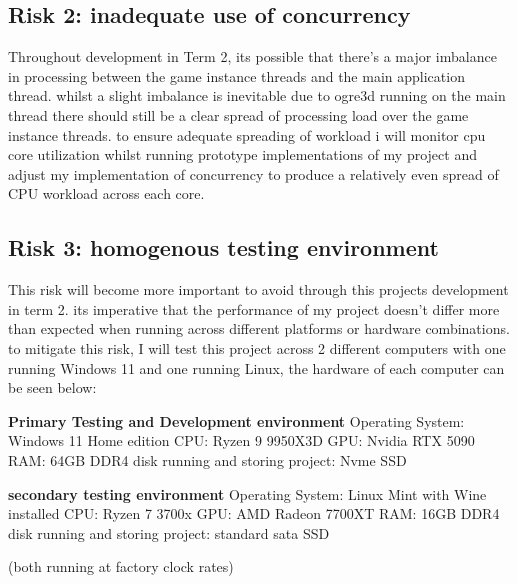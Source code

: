 \documentclass{article}
\begin{document}
\subsection{Risk 2: inadequate use of concurrency}
Throughout development in Term 2, its possible that there's a major imbalance in processing between the game instance threads and the main application thread. whilst a slight imbalance is inevitable due to ogre3d running on the main thread there should still be a clear spread of processing load over the game instance threads. to ensure adequate spreading of workload i will monitor cpu core utilization whilst running prototype implementations of my project and adjust my implementation of concurrency to produce a relatively even spread of CPU workload across each core.

\subsection{Risk 3: homogenous testing environment}
This risk will become more important to avoid through this projects development in term 2. its imperative that the performance of my project doesn't differ more than expected when running across different platforms or hardware combinations. to mitigate this risk, I will test this project across 2 different computers with one running Windows 11 and one running Linux, the hardware of each computer can be seen below:

\textbf{Primary Testing and Development environment} \newline
Operating System: Windows 11 Home edition \newline
CPU: Ryzen 9 9950X3D \newline
GPU: Nvidia RTX 5090 \newline
RAM: 64GB DDR4 \newline
disk running and storing project: Nvme SSD \newline

\textbf{secondary testing environment} \newline
Operating System: Linux Mint with Wine installed \newline
CPU: Ryzen 7 3700x \newline
GPU: AMD Radeon 7700XT \newline
RAM: 16GB DDR4 \newline
disk running and storing project: standard sata SSD \newline

(both running at factory clock rates)
\end{document}
